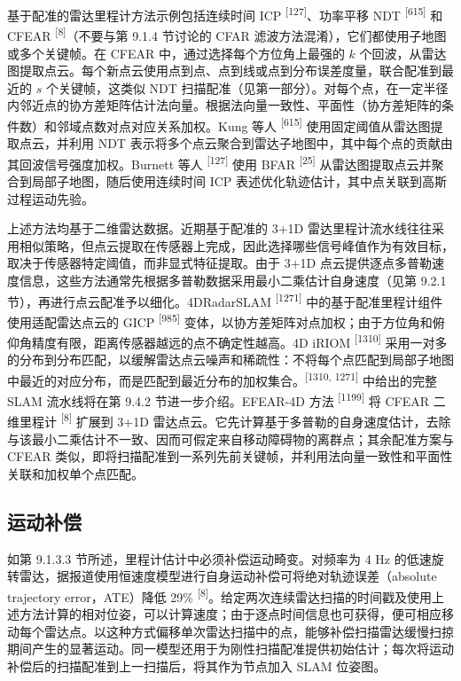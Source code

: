 基于配准的雷达里程计方法示例包括连续时间 ICP \textsuperscript{[127]}、功率平移 NDT \textsuperscript{[615]} 和 CFEAR \textsuperscript{[8]}（不要与第 9.1.4 节讨论的 CFAR 滤波方法混淆），它们都使用子地图或多个关键帧。在 CFEAR 中，通过选择每个方位角上最强的 $k$ 个回波，从雷达图提取点云。每个新点云使用点到点、点到线或点到分布误差度量，联合配准到最近的 $s$ 个关键帧，这类似 NDT 扫描配准（见第一部分）。对每个点，在一定半径内邻近点的协方差矩阵估计法向量。根据法向量一致性、平面性（协方差矩阵的条件数）和邻域点数对点对应关系加权。Kung 等人 \textsuperscript{[615]} 使用固定阈值从雷达图提取点云，并利用 NDT 表示将多个点云聚合到雷达子地图中，其中每个点的贡献由其回波信号强度加权。Burnett 等人 \textsuperscript{[127]} 使用 BFAR \textsuperscript{[25]} 从雷达图提取点云并聚合到局部子地图，随后使用连续时间 ICP 表述优化轨迹估计，其中点关联到高斯过程运动先验。

上述方法均基于二维雷达数据。近期基于配准的 3+1D 雷达里程计流水线往往采用相似策略，但点云提取在传感器上完成，因此选择哪些信号峰值作为有效目标，取决于传感器特定阈值，而非显式特征提取。由于 3+1D 点云提供逐点多普勒速度信息，这些方法通常先根据多普勒数据采用最小二乘估计自身速度（见第 9.2.1 节），再进行点云配准予以细化。4DRadarSLAM \textsuperscript{[1271]} 中的基于配准里程计组件使用适配雷达点云的 GICP \textsuperscript{[985]} 变体，以协方差矩阵对点加权；由于方位角和俯仰角精度有限，距离传感器越远的点不确定性越高。4D iRIOM \textsuperscript{[1310]} 采用一对多的分布到分布匹配，以缓解雷达点云噪声和稀疏性：不将每个点匹配到局部子地图中最近的对应分布，而是匹配到最近分布的加权集合。\textsuperscript{[1310, 1271]} 中给出的完整 SLAM 流水线将在第 9.4.2 节进一步介绍。EFEAR-4D 方法 \textsuperscript{[1199]} 将 CFEAR 二维里程计 \textsuperscript{[8]} 扩展到 3+1D 雷达点云。它先计算基于多普勒的自身速度估计，去除与该最小二乘估计不一致、因而可假定来自移动障碍物的离群点；其余配准方案与 CFEAR 类似，即将扫描配准到一系列先前关键帧，并利用法向量一致性和平面性关联和加权单个点匹配。

\subsection{运动补偿}

如第 9.1.3.3 节所述，里程计估计中必须补偿运动畸变。对频率为 4 Hz 的低速旋转雷达，据报道使用恒速度模型进行自身运动补偿可将绝对轨迹误差（absolute trajectory error，ATE）降低 29\% \textsuperscript{[8]}。给定两次连续雷达扫描的时间戳及使用上述方法计算的相对位姿，可以计算速度；由于逐点时间信息也可获得，便可相应移动每个雷达点。以这种方式偏移单次雷达扫描中的点，能够补偿扫描雷达缓慢扫掠期间产生的显著运动。同一模型还用于为刚性扫描配准提供初始估计；每次将运动补偿后的扫描配准到上一扫描后，将其作为节点加入 SLAM 位姿图。

